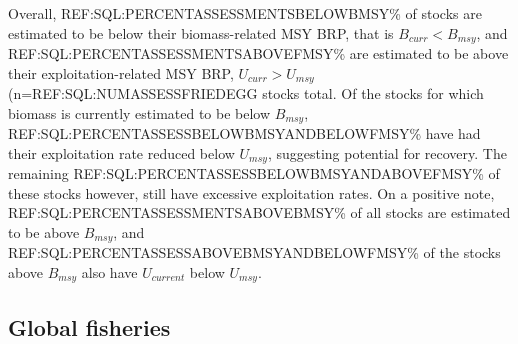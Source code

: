 Overall, REF:SQL:PERCENTASSESSMENTSBELOWBMSY\% of stocks are estimated
to be below their biomass-related MSY BRP, that is $B_{curr}<B_{msy}$,
and REF:SQL:PERCENTASSESSMENTSABOVEFMSY\% are estimated to be above
their exploitation-related MSY BRP, $U_{curr}>U_{msy}$
(n=REF:SQL:NUMASSESSFRIEDEGG stocks total.
Of the stocks for which biomass is currently estimated to be below
$B_{msy}$, REF:SQL:PERCENTASSESSBELOWBMSYANDBELOWFMSY\% have had their
exploitation rate reduced below $U_{msy}$, suggesting potential for
recovery. The remaining
REF:SQL:PERCENTASSESSBELOWBMSYANDABOVEFMSY\% of these stocks however,
still have excessive exploitation rates. On a positive note,
REF:SQL:PERCENTASSESSMENTSABOVEBMSY\% of all stocks are estimated to
be above $B_{msy}$, and REF:SQL:PERCENTASSESSABOVEBMSYANDBELOWFMSY\%
of the stocks above $B_{msy}$ also have $U_{current}$ below $U_{msy}$.


\subsection*{Global fisheries}

